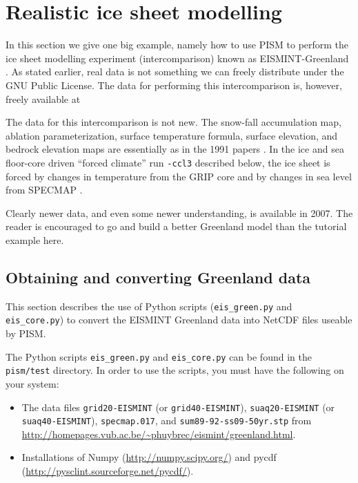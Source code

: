 \documentclass[11pt,final]{amsart}
\begin{document}
\clearpage\newpage
\section{Realistic ice sheet modelling}\label{sect:real}

In this section we give one big example, namely how to use PISM to perform the ice sheet modelling experiment (intercomparison) known as EISMINT-Greenland \cite{RitzEISMINT}.  As stated earlier, real data is not something we can freely distribute under the GNU Public License.  The data for performing this intercomparison is, however, freely available at
\medskip

\centerline{}
\medskip

The data for this intercomparison is not new.  The snow-fall accumulation map, ablation parameterization, surface temperature formula, surface elevation, and bedrock elevation maps are essentially as in the 1991 papers \cite{Letreguillyetal1991,OhmuraReeh}.  In the ice and sea floor-core driven ``forced climate'' run \verb|-ccl3| described below, the ice sheet is forced by changes in temperature from the GRIP core \cite{Dansgaardetal1993} and by changes in sea level from SPECMAP \cite{Imbrieetal1984}.

Clearly newer data, and even some newer understanding, is available in 2007.  The reader is encouraged to go and build a better Greenland model than the tutorial example here.

\subsection{Obtaining and converting Greenland data}  This section describes the use of Python scripts (\verb|eis_green.py| and \verb|eis_core.py|) to convert the EISMINT Greenland data into NetCDF files useable by PISM.

The Python scripts \verb|eis_green.py| and \verb|eis_core.py| can be found in the \verb|pism/test| directory.  In order to use the scripts, you must have the following on your system:\begin{itemize}
 \item The data files \verb|grid20-EISMINT| (or \verb|grid40-EISMINT|), \verb|suaq20-EISMINT| (or \verb|suaq40-EISMINT|), 
 \verb|specmap.017|, and \verb|sum89-92-ss09-50yr.stp| from \url{http://homepages.vub.ac.be/~phuybrec/eismint/greenland.html}.
 \item Installations of Numpy (\url{http://numpy.scipy.org/}) and pycdf (\url{http://pysclint.sourceforge.net/pycdf/}).
\end{itemize}
\end{document}
